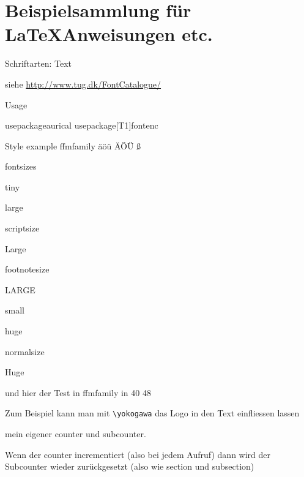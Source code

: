 \pagebreak
\section*{Beispielsammlung für \LaTeX Anweisungen etc.}


Schriftarten:
{\fontsize{40}{48} \selectfont Text}

siehe \url {http://www.tug.dk/FontCatalogue/}

Usage

usepackage{aurical}
usepackage[T1]{fontenc}





{
    \ffmfamily
    Style example ffmfamily äöü ÄÖÜ ß  \blindtext
}

    fontsizes

    {\tiny 	    tiny       }
       	
    {\large     large}

    {\scriptsize 	 scriptsize}	

    {\Large         Large}

    {\footnotesize 	 	footnotesize}

    {\LARGE         LARGE}

    {\small 	 	small }

    {\huge          huge}

    {\normalsize 	normalsize} 	

    {\Huge          Huge}


{\fontsize{40}{48} \ffmfamily   und hier der Test in ffmfamily in  40 48}




Zum Beispiel kann man mit \texttt{\textbackslash yokogawa} das Logo \yokogawa in den Text einfliessen lassen


mein eigener counter und subcounter.

Wenn der counter incrementiert (also bei jedem Aufruf) dann wird der Subcounter wieder zurückgesetzt (also wie section und subsection)


